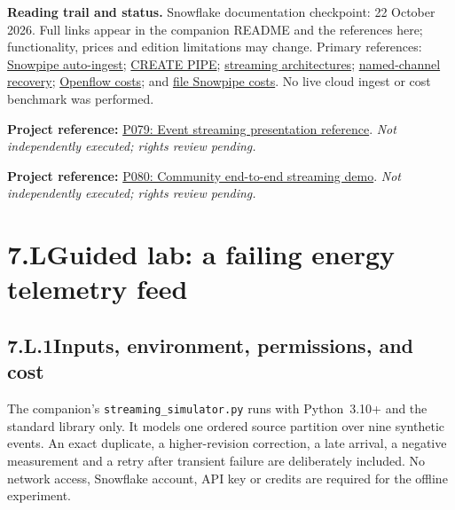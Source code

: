 \documentclass[11pt,twoside]{article}
\newcommand{\topic}[2]{\subsection*{#1\quad #2}}
\newcommand{\repo}[2]{\par\begingroup\fontsize{8.0}{9.6}\selectfont\sffamily\color{inkgray}\textbf{Project reference:} \href{#2}{#1}. \textit{Not independently executed; rights review pending.}\par\endgroup}
\begin{document}
\textbf{Reading trail and status.} Snowflake documentation checkpoint: 22 October 2026. Full links appear in the companion README and the references here; functionality, prices and edition limitations may change. Primary references: \href{https://docs.snowflake.com/en/user-guide/data-load-snowpipe-auto}{Snowpipe auto-ingest}; \href{https://docs.snowflake.com/en/sql-reference/sql/create-pipe}{CREATE PIPE}; \href{https://docs.snowflake.com/en/user-guide/snowpipe-streaming/snowpipe-streaming-high-performance-comparison}{streaming architectures}; \href{https://docs.snowflake.com/en/user-guide/snowpipe-streaming/snowpipe-streaming-operations}{named-channel recovery}; \href{https://docs.snowflake.com/en/user-guide/data-integration/openflow/cost-spcs}{Openflow costs}; and \href{https://docs.snowflake.com/en/user-guide/data-load-snowpipe-billing}{file Snowpipe costs}. No live cloud ingest or cost benchmark was performed.
\repo{P079: Event streaming presentation reference}{https://github.com/Snowflake-Labs/Summit2025-DE214}
\repo{P080: Community end-to-end streaming demo}{https://github.com/JeetThakore/Real-Time-Heart-Rate-ELT-Pipeline-Kafka-Streaming-to-Snowflake-with-Airbyte-dbt-Dagster-Tableau}
\newpage
\section*{7.L\quad Guided lab: a failing energy telemetry feed}
\topic{7.L.1}{Inputs, environment, permissions, and cost}
The companion's \texttt{streaming\_simulator.py} runs with Python~3.10+ and the standard library only. It models one ordered source partition over nine synthetic events. An exact duplicate, a higher-revision correction, a late arrival, a negative measurement and a retry after transient failure are deliberately included. No network access, Snowflake account, API key or credits are required for the offline experiment.
\end{document}
